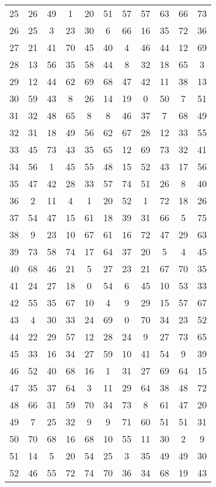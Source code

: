 \begin{table}
\begin{tabular}{c c c c c c c c c c c }
25 & 26 & 49 & 1 & 20 & 51 & 57 & 57 & 63 & 66 & 73 \\
26 & 25 & 3 & 23 & 30 & 6 & 66 & 16 & 35 & 72 & 36 \\
27 & 21 & 41 & 70 & 45 & 40 & 4 & 46 & 44 & 12 & 69 \\
28 & 13 & 56 & 35 & 58 & 44 & 8 & 32 & 18 & 65 & 3 \\
29 & 12 & 44 & 62 & 69 & 68 & 47 & 42 & 11 & 38 & 13 \\
30 & 59 & 43 & 8 & 26 & 14 & 19 & 0 & 50 & 7 & 51 \\
31 & 32 & 48 & 65 & 8 & 8 & 46 & 37 & 7 & 68 & 49 \\
32 & 31 & 18 & 49 & 56 & 62 & 67 & 28 & 12 & 33 & 55 \\
33 & 45 & 73 & 43 & 35 & 65 & 12 & 69 & 73 & 32 & 41 \\
34 & 56 & 1 & 45 & 55 & 48 & 15 & 52 & 43 & 17 & 56 \\
35 & 47 & 42 & 28 & 33 & 57 & 74 & 51 & 26 & 8 & 40 \\
36 & 2 & 11 & 4 & 1 & 20 & 52 & 1 & 72 & 18 & 26 \\
37 & 54 & 47 & 15 & 61 & 18 & 39 & 31 & 66 & 5 & 75 \\
38 & 9 & 23 & 10 & 67 & 61 & 16 & 72 & 47 & 29 & 63 \\
39 & 73 & 58 & 74 & 17 & 64 & 37 & 20 & 5 & 4 & 45 \\
40 & 68 & 46 & 21 & 5 & 27 & 23 & 21 & 67 & 70 & 35 \\
41 & 24 & 27 & 18 & 0 & 54 & 6 & 45 & 10 & 53 & 33 \\
42 & 55 & 35 & 67 & 10 & 4 & 9 & 29 & 15 & 57 & 67 \\
43 & 4 & 30 & 33 & 24 & 69 & 0 & 70 & 34 & 23 & 52 \\
44 & 22 & 29 & 57 & 12 & 28 & 24 & 9 & 27 & 73 & 65 \\
45 & 33 & 16 & 34 & 27 & 59 & 10 & 41 & 54 & 9 & 39 \\
46 & 52 & 40 & 68 & 16 & 1 & 31 & 27 & 69 & 64 & 15 \\
47 & 35 & 37 & 64 & 3 & 11 & 29 & 64 & 38 & 48 & 72 \\
48 & 66 & 31 & 59 & 70 & 34 & 73 & 8 & 61 & 47 & 20 \\
49 & 7 & 25 & 32 & 9 & 9 & 71 & 60 & 51 & 51 & 31 \\
50 & 70 & 68 & 16 & 68 & 10 & 55 & 11 & 30 & 2 & 9 \\
51 & 14 & 5 & 20 & 54 & 25 & 3 & 35 & 49 & 49 & 30 \\
52 & 46 & 55 & 72 & 74 & 70 & 36 & 34 & 68 & 19 & 43 \\

\end{tabular}
\end{table}
